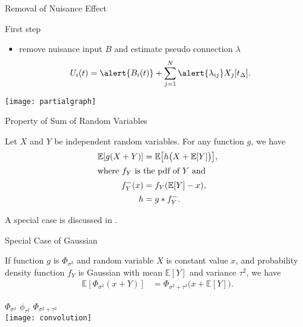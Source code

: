 \documentclass[fleqn,aspectratio=1610]{beamer}
\begin{document}
\begin{frame}[label={sec:orgdba6859}]{Removal of Nuisance Effect}
\begin{block}{First step}
\begin{itemize}
\item remove nuisance input \(B\) and estimate pseudo connection \(\lambda\)
\begin{align}
  U_i(t)
  &= \alert{B_i(t)} +
    \sum_{j=1}^{N} \alert{\lambda_{ij}} X_j[t_\Delta].
\end{align}
\end{itemize}
\end{block}
\begin{center}
\texttt{[image: partialgraph]}
\end{center}
\end{frame}


\begin{frame}[label={sec:orgca6ab31}]{Property of Sum of Random Variables}
\begin{theorem}[]
Let \(X\) and \(Y\) be independent random variables.
For any function \(g\), we have
\begin{align}
  \mathbb{E}[g(X+Y)]
  &= \mathbb{E}\bigl[h\bigl(X+\mathbb{E}[Y]\bigr)\bigr],\\
  \intertext{where \(f_{Y}\) is the pdf of \(Y\) and}
  f^{-}_{Y}(x) &= f_Y(\mathbb{E}[Y]-x),\\
  h &= g*f^{-}_{Y}.
\end{align}
\end{theorem}
A special case is discussed in \cite{Hyvaerinen2002}.
\end{frame}

\begin{frame}[label={sec:org4501f95}]{Special Case of Gaussian}
\begin{corollary}[]%
If function \(g\) is \(\Phi_{\sigma^{2}}\)
and random variable \(X\) is constant value \(x\),
and probability density function \(f_Y\) is Gaussian
with mean \(\mathbb{E}[Y]\) and variance \(\tau^{2}\), we have
\begin{align}
  \mathbb{E}[\Phi_{\sigma^{2}}(x+Y)]
  &=\Phi_{\sigma^{2}+\tau^{2}}\bigl(x+\mathbb{E}[Y]\bigr).
\end{align}
\end{corollary}
\begin{center}
\(\Phi_{\sigma^{2}}\)\hspace{.29\linewidth}
\(\phi_{\tau^{2}}\)\hspace{.24\linewidth}
\(\Phi_{\sigma^{2}\!+\!\tau^{2}}\)\\[0pt]
\texttt{[image: convolution]}    
\end{center}
\end{frame}
\end{document}
